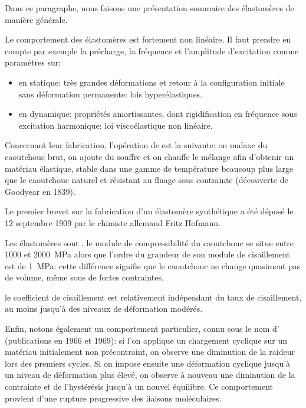 Dans ce paragraphe, nous faisons une présentation sommaire des élastomères de manière
générale.

\medskip
Le comportement des élastomères est fortement non linéaire.
Il faut prendre en compte par exemple la précharge, la fréquence et l'amplitude
d'excitation comme paramètres sur:
\begin{itemize}
	\item en statique: très grandes déformations et retour à la configuration
		initiale sans déformation permanente: lois hyperélastiques.
	\item en dynamique: propriétés amortissantes, dont rigidification en fréquence
		sous excitation harmonique: loi viscoélastique non linéaire.
\end{itemize}

\medskip
Concernant leur fabrication, l'opération de  est la suivante:
on malaxe du caoutchouc brut, on ajoute du souffre et on chauffe le
mélange afin d'obtenir un matériau élastique, stable dans une gamme de température
beaucoup plus large que le caoutchouc naturel et résistant au fluage sous contrainte
(découverte de Goodyear en 1839).

Le premier brevet sur la fabrication d'un élastomère synthétique a été déposé le 12 septembre
1909 par le chimiste allemand Fritz Hofmann.

\medskip
Les élastomères sont .
le module de compressibilité du caoutchouc se situe entre 1000 et 2000~MPa alors
que l'ordre du grandeur de son module de cisaillement est de 1~MPa: cette différence
signifie que le caoutchouc ne change quasiment pas de volume, même sous de
fortes contraintes.

\medskip
{}
le coefficient de cisaillement est relativement indépendant du taux de cisaillement, au moins
jusqu'à des niveaux de déformation modérés.

\medskip
Enfin, notons également un comportement particulier, connu sous le nom d' (publications en 1966 et 1969):
si l'on applique un chargement cyclique sur un matériau initialement non précontraint,
on observe une diminution de la raideur lors des premiers cycles. Si on impose ensuite une
déformation cyclique jusqu'à un niveau de déformation plus élevé, on observe
à nouveau une diminution de la contrainte et de l'hystérésis jusqu'à un
nouvel équilibre. Ce comportement provient d'une rupture progressive des
liaisons moléculaires.


